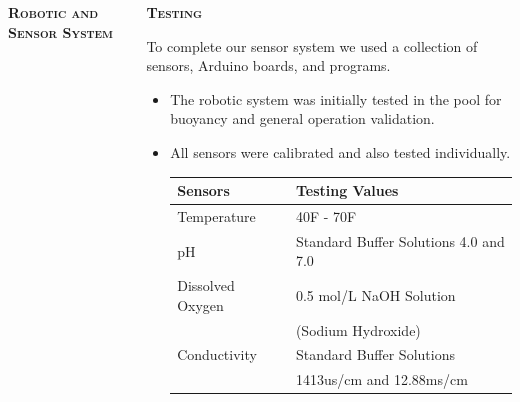 \documentclass[final,t]{beamer}
\begin{document}
\begin{frame}{}
\begin{columns}
\begin{column}{.33\linewidth}
\begin{block}{\textsc{\textbf{Robotic and Sensor System}}}
  				\end{block}

            \end{column}
            \begin{column}{.33\linewidth}

                \begin{block}{\textsc{\textbf{Testing}}}
                    \vspace*{3mm}

                    To complete our sensor system we used a collection of sensors,
                    Arduino boards, and programs.
                    \begin{itemize}
                    	\item The robotic system was initially tested in the pool for buoyancy and general operation validation.
                    	\item All sensors were calibrated and also tested individually.
                    	\begin{center}
                    	\begin{tabular}{l|l}
                    	\textbf{Sensors} & \textbf{Testing Values} \\
                    	\hline 
                    	Temperature & 40F - 70F \\
                    	pH & Standard Buffer Solutions 4.0 and 7.0 \\
                    	Dissolved Oxygen & 0.5 mol/L NaOH Solution \\
                    								&  (Sodium Hydroxide) \\
                    	Conductivity & Standard Buffer Solutions \\
                    								& 1413us/cm and 12.88ms/cm 
                    	\end{tabular}
                    	\end{center}
                     \end{itemize}

                    \vspace*{3mm}
                \end{block}


\end{column}
\end{columns}
\end{frame}
\end{document}
